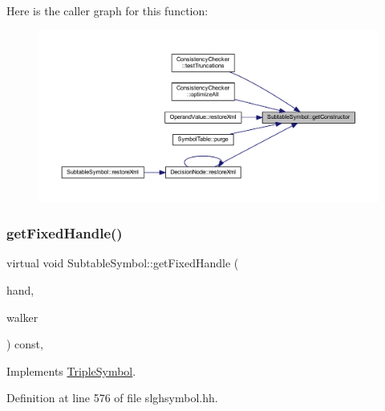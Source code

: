 Here is the caller graph for this function\+:
\nopagebreak
\begin{figure}[H]
\begin{center}
\leavevmode
\includegraphics[width=350pt]{class_subtable_symbol_aace2d4dcb93073aa935086357bee4033_icgraph}
\end{center}
\end{figure}
\mbox{\label{class_subtable_symbol_ac06bdc86f6d571f033657702b021bf92}} 
\subsubsection{\texorpdfstring{getFixedHandle()}{getFixedHandle()}}
{\footnotesize\ttfamily virtual void Subtable\+Symbol\+::get\+Fixed\+Handle (\begin{DoxyParamCaption}\item[{\mbox{\hyperlink{struct_fixed_handle}{Fixed\+Handle}} \&}]{hand,  }\item[{\mbox{\hyperlink{class_parser_walker}{Parser\+Walker}} \&}]{walker }\end{DoxyParamCaption}) const\hspace{0.3cm}{\ttfamily [inline]}, {\ttfamily [virtual]}}



Implements \mbox{\hyperlink{class_triple_symbol_aa71f48c79a2bee73e97fdfb8163b4e46}{Triple\+Symbol}}.



Definition at line 576 of file slghsymbol.\+hh.

\mbox{\label{class_subtable_symbol_a0890d79234a82b73714a3a5657e9730f}} 
